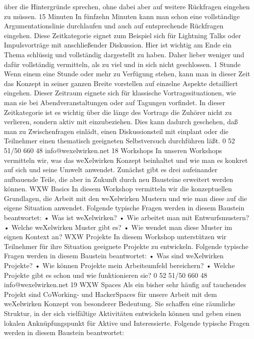 über die Hintergründe sprechen, ohne dabei aber auf weitere Rückfragen eingehen zu müssen.
15 Minuten
In fünfzehn Minuten kann man schon eine vollständige Argumentationslinie durchlaufen und auch auf 
entsprechende Rückfragen eingehen. Diese Zeitkategorie eignet zum Beispiel sich für Lightning Talks 
oder Impulsvorträge mit anschließender Diskussion.
Hier ist wichtig am Ende ein Thema schlüssig und vollständig dargestellt zu haben. Daher lieber 
weniger und dafür vollständig vermitteln, als zu viel und in sich nicht geschlossen.
1 Stunde
Wenn einem eine Stunde oder mehr zu Verfügung stehen, kann man in dieser Zeit das Konzept in seiner 
ganzen Breite vorstellen auf einzelne Aspekte detailliert eingehen. Dieser Zeitraum eignete sich für 
klassische Vortragssituationen, wie man sie bei Abendveranstaltungen oder auf Tagungen vorfindet.
In dieser Zeitkategorie ist es wichtig über die länge des Vortrags die Zuhörer nicht zu verlieren, 
sondern aktiv mit einzubeziehen. Dies kann dadurch geschehen, daß man zu Zwischenfragen einlädt, 
einen Diskussionsteil mit einplant oder die Teilnehmer einen thematisch geeigneten Selbstversuch 
durchführen läßt. 
0 52 51/50 660 48
info@wexelwirken.net
18
Workshops
In unseren Workshops vermitteln wir, was das weXelwirken Konzept beinhaltet und wie man es konkret 
auf sich und seine Umwelt anwendet. Zunächst gibt es drei aufeinander aufbauende Teile, die aber in 
Zukunft durch neu Bausteine erweitert werden können.
WXW Basics
In diesem Workshop vermitteln wir die konzeptuellen Grundlagen, die Arbeit mit den weXelwirken 
Mustern und wie man diese auf die eigene Situation anwendet. Folgende typische Fragen werden in 
diesem Baustein beantwortet:
•
Was ist weXelwirken?
•
Wie arbeitet man mit Entwurfsmustern?
•
Welche weXelwirken Muster gibt es?
•
Wie wendet man diese Muster im eignen Kontext an?
WXW Projekte
In diesem Workshop unterstützen wir Teilnehmer für ihre Situation geeignete Projekte zu entwickeln. 
Folgende typische Fragen werden in diesem Baustein beantwortet:
•
Was sind weXelwirken Projekte?
•
Wie können Projekte mein Arbeitsumfeld bereichern?
•
Welche Projekte gibt es schon und wie funktionieren sie?
0 52 51/50 660 48
info@wexelwirken.net
19
WXW Spaces
Als ein bisher sehr häufig auf tauchendes Projekt sind CoWorking- und HackerSpaces für unsere Arbeit 
mit dem weXelwirken Konzept von besonderer Bedeutung. Sie schaffen eine räumliche Struktur, in der 
sich vielfältige Aktivitäten entwickeln können und geben einen lokalen Anknüpfungspunkt für Aktive 
und Interessierte. Folgende typische Fragen werden in diesem Baustein beantwortet:
